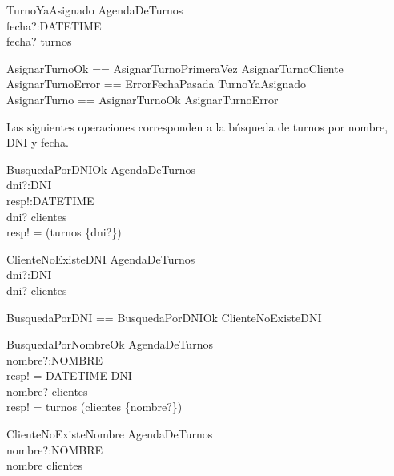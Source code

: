 \documentclass[%
  fleqn,colorlinks,linkcolor=blue,citecolor=blue,urlcolor=blue]{eptcs}
\DeclareMathOperator{\Ima}{Im}
\begin{document}
  \begin{schema}{TurnoYaAsignado}
  \Xi AgendaDeTurnos \\
  fecha?:DATETIME \\
  \where
  fecha? \in turnos
  \end{schema}

  \begin{zed}
  AsignarTurnoOk  == AsignarTurnoPrimeraVez \lor AsignarTurnoCliente \\
  AsignarTurnoError == ErrorFechaPasada \lor TurnoYaAsignado \\
  AsignarTurno == AsignarTurnoOk \lor AsignarTurnoError
  \end{zed}

  Las siguientes operaciones corresponden a la b\'usqueda de turnos por nombre, DNI y fecha.

  \begin{schema}{BusquedaPorDNIOk}
  \Xi AgendaDeTurnos \\
  dni?:DNI \\
  resp!:DATETIME \\
  \where
  dni? \in \dom clientes \\
  resp! = \dom(turnos \dres \{dni?\})
  \end{schema}

  \begin{schema}{ClienteNoExisteDNI}
  \Xi AgendaDeTurnos \\
  dni?:DNI \\
  \where
  dni? \notin \dom clientes
  \end{schema}

  \begin{zed}
  BusquedaPorDNI == BusquedaPorDNIOk \lor ClienteNoExisteDNI
  \end{zed}

  \begin{schema}{BusquedaPorNombreOk}
  \Xi AgendaDeTurnos \\
  nombre?:NOMBRE \\
  resp! = DATETIME \pfun DNI \\
  \where
  nombre? \in \Ima clientes \\
  resp! = turnos \dres \dom (clientes \dres \{nombre?\})
  \end{schema}

  \begin{schema}{ClienteNoExisteNombre}
  \Xi AgendaDeTurnos \\
  nombre?:NOMBRE \\
  \where
  nombre \notin \Ima clientes
  \end{schema}
\end{document}

